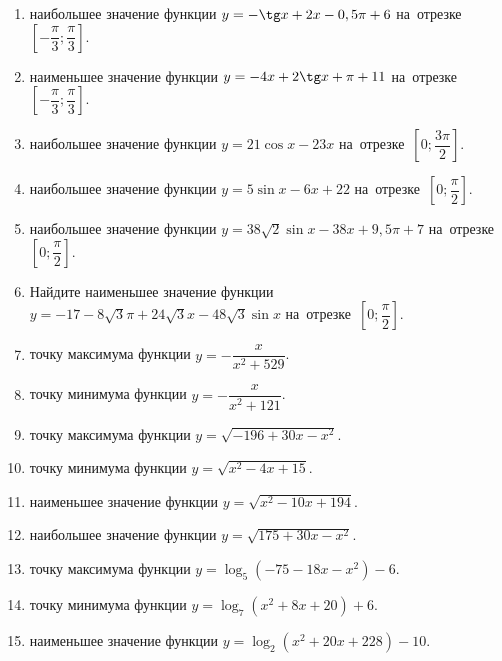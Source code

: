 \documentclass[a4paper,10pt]{article}
\begin{document}
\begin{enumerate}
\item {} наибольшее значение функции $y=-\tg x +2x-0,5\pi +6$ на~отрезке~$\left[-\dfrac{\pi}{3};\dfrac{\pi}{3}\right]$.

\item {} наименьшее значение функции $y=-4x +2\tg x+\pi+11$ на~отрезке~$\left[-\dfrac{\pi}{3};\dfrac{\pi}{3}\right]$.

\item {} наибольшее значение функции $y=21\cos x-23x$ на~отрезке~$\left[0;\dfrac{3\pi}{2}\right]$.

\item {} наибольшее значение функции $y=5\sin x-6x+22$ на~отрезке~$\left[0;\dfrac{\pi}{2}\right]$.

\item {} наибольшее значение функции $y=38\sqrt{2}\sin x-38x+9,5\pi +7$ на~отрезке~$\left[0;\dfrac{\pi}{2}\right]$.

\item Найдите наименьшее значение функции $y=-17-8\sqrt{3}\pi+24\sqrt{3}x-48\sqrt{3}\sin x$ на~отрезке~$\left[0;\dfrac{\pi}{2}\right]$.

\item {} точку максимума функции $y=-\dfrac{x}{ x^2 +529}$.

\item {} точку минимума функции $y=-\dfrac{x}{ x^2 +121}$.

\item {} точку максимума функции $y=\sqrt{-196+30x-x^2}$.

\item {} точку минимума функции $y=\sqrt{x^2-4x+15}$.

\item {} наименьшее значение функции $y=\sqrt{x^2-10x+194}$.

\item {} наибольшее значение функции $y=\sqrt{175+30x-x^2}$.

\item {} точку максимума функции $y=\log_5\left(-75-18x-x^2\right)-6$.

\item {} точку минимума функции $y=\log_7\left(x^2+8x+20\right)+6$.

\item {} наименьшее значение функции $y=\log_2\left(x^2+20x+228\right)-10$.


\end{enumerate}
\end{document}
